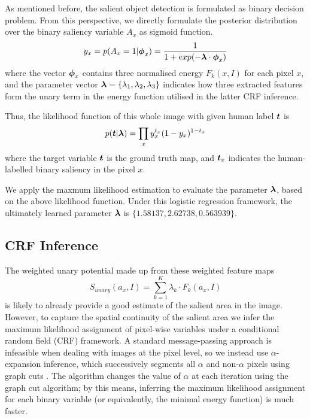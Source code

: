 \documentclass[10pt,twocolumn,letterpaper]{article}
\newcommand{\SUM}{\sum\limits}
\begin{document}
As mentioned before, the salient object detection is formulated as binary decision problem. From this perspective, we directly formulate the posterior distribution over the binary saliency variable $A_x$ as sigmoid function.
$$ y_x = p ( A_x = 1 | \boldsymbol{\phi}_x) = \frac{1}{1 + exp(-\boldsymbol{\lambda} \cdot \boldsymbol{\phi}_x)}$$
where the vector $\boldsymbol{\phi}_x$ contains three normalised energy $F_k (x, I)$ for each pixel $x$, and the parameter vector $\boldsymbol{\lambda} = \{ \lambda_1, \lambda_2, \lambda_3\}$ indicates how three extracted features form the unary term in the energy function utilised in the latter CRF inference.

Thus, the likelihood function of this whole image with given human label $\boldsymbol{t}$ is
$$ p( \boldsymbol{t} | \boldsymbol{\lambda}) = \prod_{x} y_{x}^{t_{x}} (1 - y_{x})^{1-t_x} $$
where the target variable $\boldsymbol{t}$ is the ground truth map, and $\boldsymbol{t}_x$ indicates the human-labelled binary saliency in the pixel $x$. 

We apply the maxmum likelihood estimation to evaluate the parameter $\boldsymbol{\lambda}$, based on the above likelihood function. Under this logistic regression framework, the ultimately learned parameter $\boldsymbol{\lambda}$ is $\{ 1.58137, 2.62738, 0.563939 \}$. 
\subsection{CRF Inference}
The weighted unary potential made up from these weighted feature maps $$S_{unary}(a_x,I) = \SUM_{k=1}^K \lambda_k \cdot F_k(a_x,I)$$ is likely to already provide a good estimate of the salient area in the image.  However, to capture the spatial continuity of the salient area we infer the maximum likelihood assignment of pixel-wise variables under a conditional random field (CRF) framework.  A standard message-passing approach is infeasible when dealing with images at the pixel level, so we instead use $\alpha$-expansion inference, which successively segments all $\alpha$ and non-$\alpha$ pixels using graph cuts \cite{graphcut}.  The algorithm changes the value of $\alpha$ at each iteration using the graph cut algorithm; by this means, inferring the maximum likelihood assignment for each binary variable (or equivalently, the minimal energy function) is much faster. 
\end{document}
